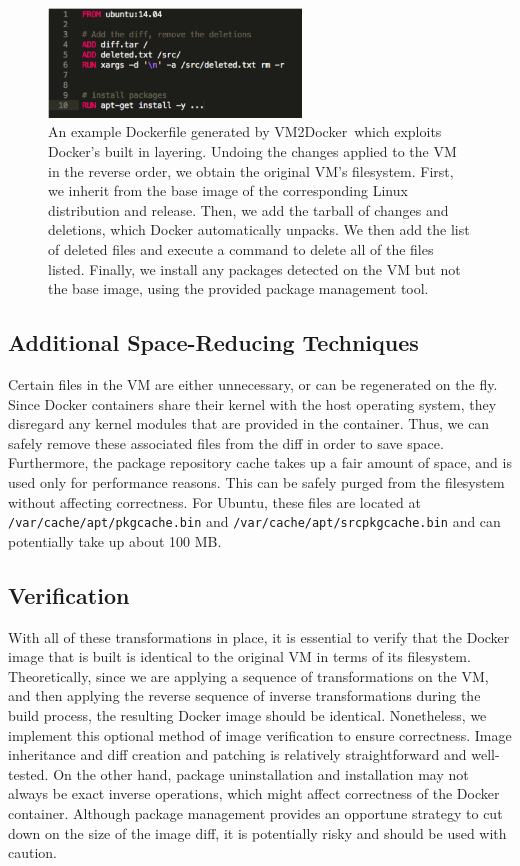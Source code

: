 \documentclass[\myfontsize, letterpaper]{article}
\newcommand{\projectname}{VM2Docker}
\begin{document}
\begin{figure}[h]
\centeringfu
    \includegraphics[width=0.6\textwidth]{dockerfile.png}
    \caption{An example Dockerfile generated by \projectname\ which exploits Docker's built in layering. Undoing the changes applied to the VM in the reverse order, we obtain the original VM's filesystem. First, we inherit from the base image of the corresponding Linux distribution and release. Then, we add the tarball of changes and deletions, which Docker automatically unpacks. We then add the list of deleted files and execute a command to delete all of the files listed. Finally, we install any packages detected on the VM but not the base image, using the provided package management tool.}
\end{figure}


\subsection{Additional Space-Reducing Techniques}
Certain files in the VM are either unnecessary, or can be regenerated on the fly. Since Docker containers share their kernel with the host operating system, they disregard any kernel modules that are provided in the container. Thus, we can safely remove these associated files from the diff in order to save space. Furthermore, the package repository cache takes up a fair amount of space, and is used only for performance reasons. This can be safely purged from the filesystem without affecting correctness. For Ubuntu, these files are located at \texttt{/var/cache/apt/pkgcache.bin} and \texttt{/var/cache/apt/srcpkgcache.bin} and can potentially take up about 100 MB.

\subsection{Verification}
With all of these transformations in place, it is essential to verify that the Docker image that is built is identical to the original VM in terms of its filesystem. Theoretically, since we are applying a sequence of transformations on the VM, and then applying the reverse sequence of inverse transformations during the build process, the resulting Docker image should be identical. Nonetheless, we implement this optional method of image verification to ensure correctness. Image inheritance and diff creation and patching is relatively straightforward and well-tested. On the other hand, package uninstallation and installation may not always be exact inverse operations, which might affect correctness of the Docker container. Although package management provides an opportune strategy to cut down on the size of the image diff, it is potentially risky and should be used with caution.
\end{document}
